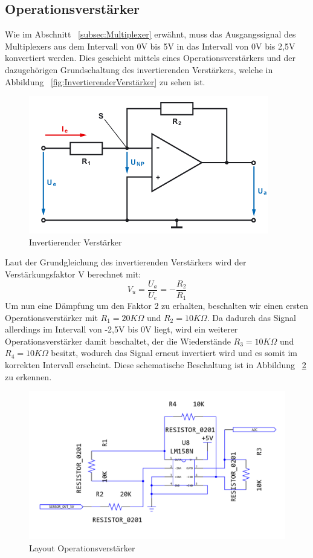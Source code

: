 \subsection{Operationsverstärker}\label{subsec:Operationsverstärker}
Wie im Abschnitt ~\ref{subsec:Multiplexer} erwähnt, muss das Ausgangssignal des Multiplexers aus dem Intervall von 0V bis 5V in das Intervall von 0V bis 2,5V konvertiert werden. Dies geschieht mittels eines Operationsverstärkers und der dazugehörigen Grundschaltung des invertierenden Verstärkers, welche in Abbildung ~\ref{fig:InvertierenderVerstärker} zu sehen ist.
\begin{figure}[H]
	\includegraphics{images/InvertierenderVerstaerker.png}	
	\caption{Invertierender Verstärker}
	\label{fig:InvertierenderVerstaerker}
\end{figure}
Laut der Grundgleichung des invertierenden Verstärkers wird der Verstärkungsfaktor V berechnet mit:
\[ V_u = \frac{U_a}{U_e} = -\frac{R_2}{R_1} \]
Um nun eine Dämpfung um den Faktor 2 zu erhalten, beschalten wir einen ersten Operationsverstärker mit \(R_1 = 20K\Omega\) und \(R_2 = 10K\Omega\). Da dadurch das Signal allerdings im Intervall von -2,5V bis 0V liegt, wird ein weiterer Operationsverstärker damit beschaltet, der die Wiederstände \(R_3 = 10K\Omega\) und \(R_4 = 10K\Omega\) besitzt, wodurch das Signal erneut invertiert wird und es somit im korrekten Intervall erscheint. 
\newline
Diese schematische Beschaltung ist in Abbildung ~\ref{fig:Layout_OP} zu erkennen.
\begin{figure}[H]
	\includegraphics[width=\textwidth]{images/Layout_OP.png}	
	\caption{Layout Operationsverstärker}
	\label{fig:Layout_OP}
\end{figure}
